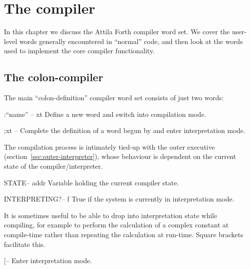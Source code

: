 \chapter{The compiler}
\label{chap:compiler}

\begin{precis}
  In this chapter we discuss the Attila Forth compiler word set. We
  cover the user-level words generally encountered in ``normal'' code,
  and then look at the words used to implement the core compiler
  functionality.
\end{precis}


\section{The colon-compiler}
\label{sec:colon-compiler}

The main ``colon-definition'' compiler word set consists of just two
words:

\begin{defword}[colon]{:}{``name'' -- xt}
  Define a new word  and switch into compilation mode.
\end{defword}

\begin{defword}[semi]{;}{xt --}
  Complete the definition of a word begun by \word{:} and enter
  interpretation mode.
\end{defword}

The compilation process is intimately tied-up with the outer executive
(section~\ref{sec:outer-interpreter}), whose behaviour is dependent on
the current state of the compiler/interpreter.

\begin{defword}{STATE}{-- addr}
  Variable holding the current compiler state.
\end{defword}

\begin{defword}{INTERPRETING?}{-- f}
  True if the system is currently in interpretation mode.
\end{defword}

It is sometimes useful to be able to drop into interpretation state
while compiling, for example to perform the calculation of a complex
constant at compile-time rather than repeating the calculation at
run-time. Square brackets facilitate this.

\begin{defword}{[}{--}
  Enter interpretation mode.
\end{defword}

